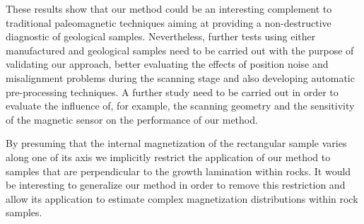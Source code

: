 \documentclass[draft,gc]{agutex}
\begin{document}
\begin{article}
These results show that our method could be an interesting complement
to traditional paleomagnetic techniques aiming at providing a 
non-destructive diagnostic of geological samples.
Nevertheless, further tests using either manufactured and geological samples 
need to be carried out with the purpose of validating our approach,
better evaluating the effects of position noise
and misalignment problems during the scanning stage and
also developing automatic pre-processing techniques.
A further study need to be carried out in order to evaluate
the influence of, for example, the scanning geometry and the 
sensitivity of the magnetic sensor on the performance of our method.

By presuming that the internal magnetization of the rectangular 
sample varies along one of its axis we implicitly restrict the
application of our method to samples that are perpendicular
to the growth lamination within rocks.
It would be interesting to generalize our method in order to
remove this restriction and allow its application to estimate
complex magnetization distributions within rock samples.


%
%
%
%
%
%
%


\end{article}
\end{document}
